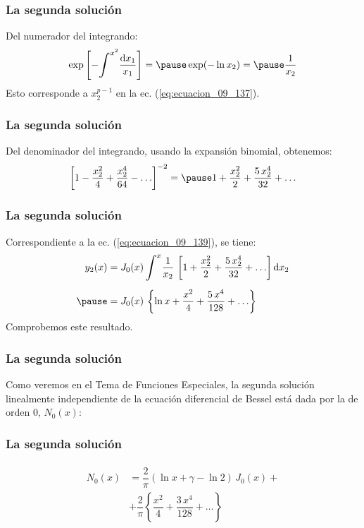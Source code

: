 \documentclass[12pt]{beamer}
\begin{document}
\begin{frame}
\frametitle{La segunda solución}
Del numerador del integrando:
\pause
\begin{eqnarray*}
\exp \left[ - \scaleint{6ex}^{x^{2}} \dfrac{\dd{x_{1}}}{x_{1}} \right]= \pause \exp (- \ln x_{2}) = \pause \dfrac{1}{x_{2}} 
\end{eqnarray*}
Esto corresponde a $x_{2}^{p-1}$ en la ec. (\ref{eq:ecuacion_09_137}).
\end{frame}
\begin{frame}
\frametitle{La segunda solución}
Del denominador del integrando, usando la expansión binomial, obtenemos:
\pause
\begin{eqnarray*}
\left[ 1 - \dfrac{x_{2}^{2}}{4} + \dfrac{x_{2}^{4}}{64} - \ldots \right]^{-2} = \pause 1 + \dfrac{x_{2}^{2}}{2} + \dfrac{5 \, x_{2}^{4}}{32} + \ldots
\end{eqnarray*}
\end{frame}
\begin{frame}
\frametitle{La segunda solución}
Correspondiente a la ec. (\ref{eq:ecuacion_09_139}), se tiene:
\pause
\begin{eqnarray}
\begin{aligned}[b]
y_{2} (x) &= J_{0} (x) \, \scaleint{6ex}^{x} \dfrac{1}{x_{2}} \, \left[ 1 + \dfrac{x_{2}^{2}}{2} + \dfrac{5 \, x_{2}^{4}}{32} + \ldots \right] \dd{x_{2}} \nonumber \\[0.5em] \pause
&= J_{0} (x) \, \left\{ \ln x + \dfrac{x^{2}}{4} + \dfrac{5 \, x^{4}}{128} + \ldots  \right\}
\end{aligned}
\label{eq:ecuacion_09_142c}
\end{eqnarray}
\pause
Comprobemos este resultado.
\end{frame}
\begin{frame}
\frametitle{La segunda solución}
Como veremos en el Tema de Funciones Especiales, \pause la segunda solución linealmente independiente de la ecuación diferencial de Bessel está dada por la  de orden $0$, $N_{0}(x)$:
\end{frame}
\begin{frame}
\frametitle{La segunda solución}
\begin{align}
\begin{aligned}
N_{0}(x) &= \dfrac{2}{\pi} (\ln x + \gamma - \ln 2) \,J_{0} (x) + \\[0.5em]
&+ \dfrac{2}{\pi} \left\{ \dfrac{x^{2}}{4} + \dfrac{3 \, x^{4}}{128} + \ldots   \right\}
\end{aligned}
\label{eq:ecuacion_09_142d}
\end{align}
\end{frame}
\end{document}
